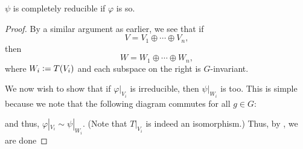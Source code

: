 \begin{prop} \label{prop:compreducibleequiv}
	$\psi$ is completely reducible if $\varphi$ is so.
\end{prop}
\begin{proof} 
	By a similar argument as earlier, we see that if
	\begin{equation*} 
		V = V_1 \oplus \cdots \oplus V_n,
	\end{equation*}
	then
	\begin{equation*} 
		W = W_1 \oplus \cdots \oplus W_n,
	\end{equation*}
	where $W_i \vcentcolon= T(V_i)$ and each subspace on the right is $G$-invariant.

	We now wish to show that if $\varphi|_{V_i}$ is irreducible, then $\psi|_{W_i}$ is too. This is simple because we note that the following diagram commutes for all $g \in G:$
	\begin{center}
	\end{center}
	and thus, $\varphi|_{V_i} \sim \psi|_{W_i}.$ (Note that $T|_{V_i}$ is indeed an isomorphism.) Thus, by , we are done
\end{proof}

